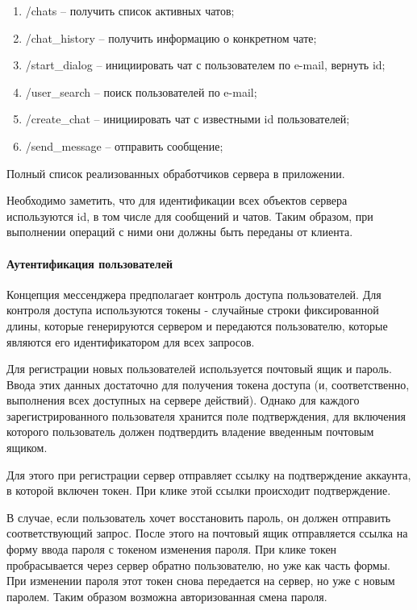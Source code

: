 \documentclass[explnote]{espd}
\begin{document}
\begin{enumerate}
\item /chats -- получить список активных чатов;
\item /chat\_history -- получить информацию о конкретном чате;
\item /start\_dialog -- инициировать чат с пользователем по e-mail, вернуть id;
\item /user\_search -- поиск пользователей по e-mail;
\item /create\_chat -- инициировать чат с известными id пользователей;
\item /send\_message -- отправить сообщение;
\end{enumerate}

Полный список реализованных обработчиков сервера в приложении.

Необходимо заметить, что для идентификации всех объектов сервера используются id, в том числе для сообщений и чатов. Таким образом, при выполнении операций с ними они должны быть переданы от клиента.

\paragraph{Аутентификация пользователей}
Концепция мессенджера предполагает контроль доступа пользователей. Для контроля доступа используются токены - случайные строки фиксированной длины, которые генерируются сервером и передаются пользователю, которые являются его идентификатором для всех запросов.

Для регистрации новых пользователей используется почтовый ящик и пароль. Ввода этих данных достаточно для получения токена доступа (и, соответственно, выполнения всех доступных на сервере действий). Однако для каждого зарегистрированного пользователя хранится поле подтверждения, для включения которого пользователь должен подтвердить владение введенным почтовым ящиком.

Для этого при регистрации сервер отправляет ссылку на подтверждение аккаунта, в которой включен токен. При клике этой ссылки происходит подтверждение.

В случае, если пользователь хочет восстановить пароль, он должен отправить соответствующий запрос. После этого на почтовый ящик отправляется ссылка на форму ввода пароля с токеном изменения пароля. При клике токен пробрасывается через сервер обратно пользователю, но уже как часть формы. При изменении пароля этот токен снова передается на сервер, но уже с новым паролем. Таким образом возможна авторизованная смена пароля.
\end{document}

